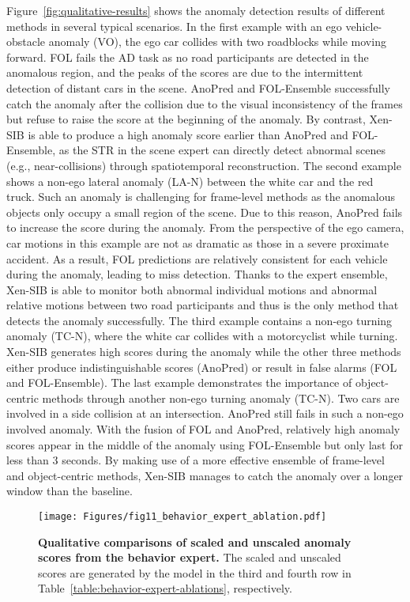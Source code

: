 Figure~\ref{fig:qualitative-results} shows the anomaly detection results of different methods in several typical scenarios. In the first example with an ego vehicle-obstacle anomaly (VO), the ego car collides with two roadblocks while moving forward. FOL fails the AD task as no road participants are detected in the anomalous region, and the peaks of the scores are due to the intermittent detection of distant cars in the scene. AnoPred and FOL-Ensemble successfully catch the anomaly after the collision due to the visual inconsistency of the frames but refuse to raise the score at the beginning of the anomaly. By contrast, Xen-SIB is able to produce a high anomaly score earlier than AnoPred and FOL-Ensemble, as the STR in the scene expert can directly detect abnormal scenes (e.g., near-collisions) through spatiotemporal reconstruction. The second example shows a non-ego lateral anomaly (LA-N) between the white car and the red truck. Such an anomaly is challenging for frame-level methods as the anomalous objects only occupy a small region of the scene. Due to this reason, AnoPred fails to increase the score during the anomaly. From the perspective of the ego camera, car motions in this example are not as dramatic as those in a severe proximate accident. As a result, FOL predictions are relatively consistent for each vehicle during the anomaly, leading to miss detection. Thanks to the expert ensemble, Xen-SIB is able to monitor both abnormal individual motions and abnormal relative motions between two road participants and thus is the only method that detects the anomaly successfully. The third example contains a non-ego turning anomaly (TC-N), where the white car collides with a motorcyclist while turning. Xen-SIB generates high scores during the anomaly while the other three methods either produce indistinguishable scores (AnoPred) or result in false alarms (FOL and FOL-Ensemble). The last example demonstrates the importance of object-centric methods through another non-ego turning anomaly (TC-N). Two cars are involved in a side collision at an intersection. AnoPred still fails in such a non-ego involved anomaly. With the fusion of FOL and AnoPred, relatively high anomaly scores appear in the middle of the anomaly using FOL-Ensemble but only last for less than $3$ seconds. By making use of a more effective ensemble of frame-level and object-centric methods, Xen-SIB manages to catch the anomaly over a longer window than the baseline.

\begin{figure*}
  \centering
  \texttt{[image: Figures/fig11\_behavior\_expert\_ablation.pdf]}
  \caption{\textbf{Qualitative comparisons of scaled and unscaled anomaly scores from the behavior expert.} The scaled and unscaled scores are generated by the model in the third and fourth row in Table~\ref{table:behavior-expert-ablations}, respectively.}
  \label{fig:behavior-expert-ablation}
\end{figure*}

